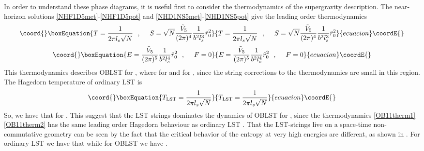 \documentclass[a4paper,twoside,titlepage,12pt]{article}
\begin{document}
In order to understand these phase diagrams, it is useful first to
consider the thermodynamics of the supergravity 
description.
The near-horizon solutions \eqref{NHF1D5met}-\eqref{NHF1D5pot} 
and \eqref{NHD1NS5met}-\eqref{NHD1NS5pot}
give the leading order thermodynamics \cite{Harmark:2000wv}
%
\begin{equation}\coord{}\boxEquation{
\label{OB11therm1}
T = \frac{1}{2\pi \lsn \sqrt{N}}  \spa
S = \sqrt{N} \frac{\tilde{V}_5 }{(2\pi)^4} \frac{1}{b^2 \lsn^3} \tilde{r}_0^2
}{
T = \frac{1}{2\pi \lsn \sqrt{N}}  \spa
S = \sqrt{N} \frac{\tilde{V}_5 }{(2\pi)^4} \frac{1}{b^2 \lsn^3} \tilde{r}_0^2
}{ecuacion}\coordE{}\end{equation}
%
\begin{equation}\coord{}\boxEquation{
\label{OB11therm2}
E= \frac{\tilde{V}_5 }{(2\pi)^5} \frac{1}{b^2 \lsn^4} \tilde{r}_0^2
\spa 
F= 0
}{
E= \frac{\tilde{V}_5 }{(2\pi)^5} \frac{1}{b^2 \lsn^4} \tilde{r}_0^2
\spa 
F= 0
}{ecuacion}\coordE{}\end{equation}
%
This thermodynamics describes \coordHE{} OBLST for 
\coordHE{},
where \coordHE{} for \coordHE{} and
\coordHE{} for \coordHE{}, 
since the string corrections to the
thermodynamics are small in this region.
The Hagedorn temperature of ordinary \coordHE{} LST is
%
\begin{equation}\coord{}\boxEquation{
\tlst = \frac{1}{2\pi \lsn \sqrt{N}}
}{
\tlst = \frac{1}{2\pi \lsn \sqrt{N}}
}{ecuacion}\coordE{}\end{equation}
%
So, we have that \coordHE{} for \coordHE{}.
This suggest that the LST-strings dominates the dynamics of \coordHE{} OBLST
for \coordHE{}, since the thermodynamics
\eqref{OB11therm1}-\eqref{OB11therm2} has the same 
leading order Hagedorn behaviour as ordinary \coordHE{} LST 
\cite{Maldacena:1996ya,Maldacena:1997cg,Harmark:2000hw}.
That the LST-strings live on a space-time non-commutative geometry
can be seen by the fact that the critical behavior of the
entropy at very high energies are different, as shown 
in \cite{Harmark:2000wv}.
For ordinary \coordHE{} LST we have that \cite{Harmark:2000hw,Berkooz:2000mz} 
\coordHE{}
while for \coordHE{} OBLST we have \cite{Harmark:2000wv} 
\coordHE{}.
\end{document}
